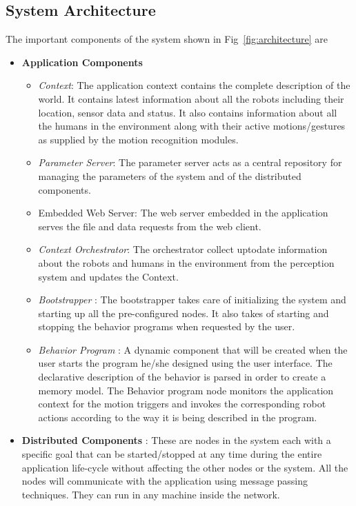 \documentclass{llncs}
\begin{document}
\subsection{System Architecture}
The important components of the system shown in Fig~\ref{fig:architecture} are
\begin{itemize}
\item \textbf{Application Components}
\begin{itemize}
\item \emph{Context}: The application context contains the complete description of the world. It contains latest information about all the robots including their location, sensor data and status. It also contains information about all the humans in the environment along with their active motions/gestures as supplied by the motion recognition modules.
\item \emph{Parameter Server}: The parameter server acts as a central repository for managing the parameters of the system and of the distributed components.
\item Embedded Web Server: The web server embedded in the application serves the file and data requests from the web client.
\item \emph{Context Orchestrator}: The orchestrator collect uptodate information about the robots and humans in the environment from the perception system and updates the Context.
\item \emph{Bootstrapper} : The bootstrapper takes care of initializing the system and starting up all the pre-configured nodes. It also takes of starting and stopping the behavior programs when requested by the user. 
\item \emph{Behavior Program} : A dynamic component that will be created when the user starts the program he/she designed using the user interface. The declarative description of the behavior is parsed in order to create a memory model. The Behavior program node monitors the application context for the motion triggers and invokes the corresponding robot actions according to the way it is being described in the program.
\end{itemize}
\item \textbf{Distributed Components} : These are nodes in the system each with a specific goal that can be started/stopped at any time during the entire application life-cycle without affecting the other nodes or the system. All the nodes will communicate with the application using message passing techniques. They can run in any machine inside the network.

\end{itemize}
\end{document}
